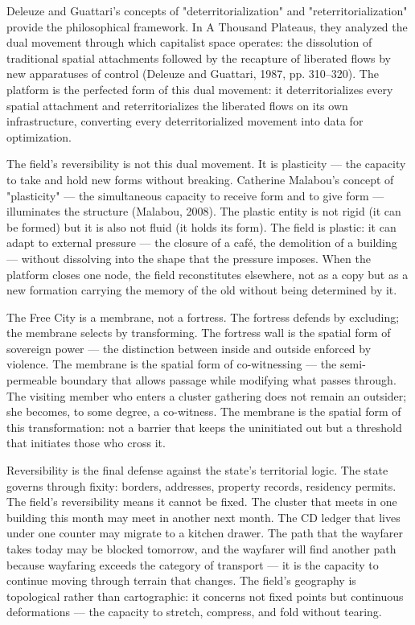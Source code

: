 Deleuze and Guattari's concepts of "deterritorialization" and "reterritorialization" provide the philosophical framework. In A Thousand Plateaus, they analyzed the dual movement through which capitalist space operates: the dissolution of traditional spatial attachments followed by the recapture of liberated flows by new apparatuses of control (Deleuze and Guattari, 1987, pp. 310–320). The platform is the perfected form of this dual movement: it deterritorializes every spatial attachment and reterritorializes the liberated flows on its own infrastructure, converting every deterritorialized movement into data for optimization.

The field's reversibility is not this dual movement. It is plasticity — the capacity to take and hold new forms without breaking. Catherine Malabou's concept of "plasticity" — the simultaneous capacity to receive form and to give form — illuminates the structure (Malabou, 2008). The plastic entity is not rigid (it can be formed) but it is also not fluid (it holds its form). The field is plastic: it can adapt to external pressure — the closure of a café, the demolition of a building — without dissolving into the shape that the pressure imposes. When the platform closes one node, the field reconstitutes elsewhere, not as a copy but as a new formation carrying the memory of the old without being determined by it.

The Free City is a membrane, not a fortress. The fortress defends by excluding; the membrane selects by transforming. The fortress wall is the spatial form of sovereign power — the distinction between inside and outside enforced by violence. The membrane is the spatial form of co-witnessing — the semi-permeable boundary that allows passage while modifying what passes through. The visiting member who enters a cluster gathering does not remain an outsider; she becomes, to some degree, a co-witness. The membrane is the spatial form of this transformation: not a barrier that keeps the uninitiated out but a threshold that initiates those who cross it.

Reversibility is the final defense against the state's territorial logic. The state governs through fixity: borders, addresses, property records, residency permits. The field's reversibility means it cannot be fixed. The cluster that meets in one building this month may meet in another next month. The CD ledger that lives under one counter may migrate to a kitchen drawer. The path that the wayfarer takes today may be blocked tomorrow, and the wayfarer will find another path because wayfaring exceeds the category of transport — it is the capacity to continue moving through terrain that changes. The field's geography is topological rather than cartographic: it concerns not fixed points but continuous deformations — the capacity to stretch, compress, and fold without tearing.

